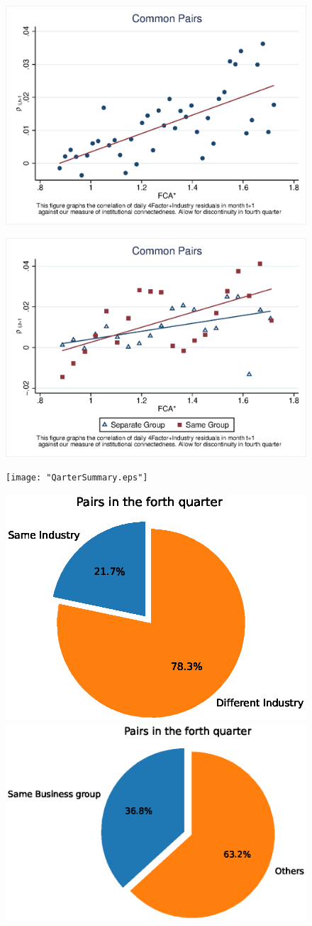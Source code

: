 \documentclass[12pt, a4paper]{article}
\begin{document}
 \begin{figure}[htbp]
	\centering  
	\includegraphics[width=0.8\linewidth]{"Qmcorr5subsample.eps"}
\end{figure}

 \begin{figure}[htbp]
	\centering  
	\includegraphics[width=0.8\linewidth]{"Qmcorr5lrdbgsubsample.eps"}
\end{figure}


 \begin{figure}[htbp]
	\centering  
	\texttt{[image: "QarterSummary.eps"]}
\end{figure}

	\begin{figure}   
	\centering
	\includegraphics[width=0.45\linewidth]{"sameIndustryinQuarter.eps"}
	\includegraphics[width=0.45\linewidth]{"sameIBGinQuarter.eps"}
\end{figure}
\FloatBarrier
\end{document}
